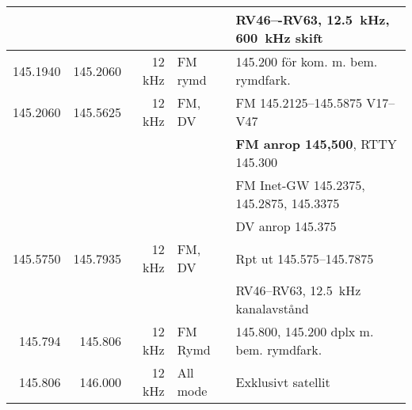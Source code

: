 \begin{tabular}{rrrll}
         &           &         &              & RV46–-RV63, \qty{12,5}{\kilo\hertz}, \qty{600}{\kilo\hertz} skift \\ \hline
145.1940 & 145.2060  & 12 kHz  & FM rymd      & \num{145,200} för kom. m. bem. rymdfark.                        \\ \hline
145.2060 & 145.5625  & 12 kHz  & FM, DV       & FM \numrange{145,2125}{145,5875}  V17–V47                       \\
         &           &         &              & \textbf{FM anrop 145,500}, RTTY 145.300                         \\
         &           &         &              & FM Inet-GW \num{145,2375}, \num{145,2875}, \num{145,3375}       \\
         &           &         &              & DV anrop \num{145,375}                                          \\ \hline
145.5750 & 145.7935  & 12 kHz  & FM, DV       & Rpt ut \numrange{145,575}{145,7875}                             \\
         &           &         &              & RV46–RV63, \qty{12,5}{\kilo\hertz} kanalavstånd                  \\ \hline
145.794  & 145.806   & 12 kHz  & FM Rymd      & \num{145,800}, \num{145,200} dplx m. bem. rymdfark.              \\ \hline
145.806  & 146.000   & 12 kHz  & All mode     & Exklusivt satellit                                              \\ \hline
\end{tabular}

